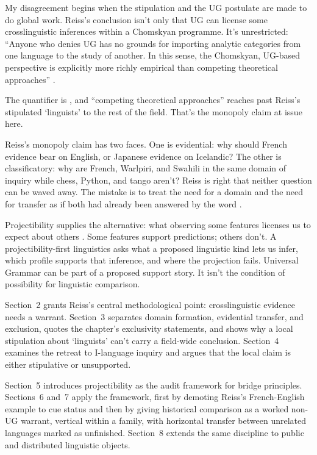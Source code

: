 \documentclass[12pt]{article}
\begin{document}
My disagreement begins when the stipulation and the UG postulate are made to do global work. Reiss's conclusion isn't only that UG can license some crosslinguistic inferences within a Chomskyan programme. It's unrestricted: \enquote{Anyone who denies UG has no grounds for importing analytic categories from one language to the study of another. In this sense, the Chomskyan, UG-based perspective is explicitly more richly empirical than competing theoretical approaches} \citep[sec.~6]{reiss2026armchair}.

The quantifier is , and \enquote{competing theoretical approaches} reaches past Reiss's stipulated `linguists' to the rest of the field. That's the monopoly claim at issue here.

Reiss's monopoly claim has two faces. One is evidential: why should French evidence bear on English, or Japanese evidence on Icelandic? The other is classificatory: why are French, Warlpiri, and Swahili in the same domain of inquiry while chess, Python, and tango aren't? Reiss is right that neither question can be waved away. The mistake is to treat the need for a domain and the need for transfer as if both had already been answered by the word .

Projectibility supplies the alternative: what observing some features licenses us to expect about others \citep{Goodman1955,reynolds2026kindsProjectibilityProfiles}. Some features support predictions; others don't. A projectibility-first linguistics asks what a proposed linguistic kind lets us infer, which profile supports that inference, and where the projection fails. Universal Grammar can be part of a proposed support story. It isn't the condition of possibility for linguistic comparison.

Section~2 grants Reiss's central methodological point: crosslinguistic evidence needs a warrant. Section~3 separates domain formation, evidential transfer, and exclusion, quotes the chapter's exclusivity statements, and shows why a local stipulation about `linguists' can't carry a field-wide conclusion. Section~4 examines the retreat to I-language inquiry and argues that the local claim is either stipulative or unsupported.

Section~5 introduces projectibility as the audit framework for bridge principles. Sections~6 and~7 apply the framework, first by demoting Reiss's French-English  example to cue status and then by giving historical comparison as a worked non-UG warrant, vertical within a family, with horizontal transfer between unrelated languages marked as unfinished. Section~8 extends the same discipline to public and distributed linguistic objects.
\end{document}
